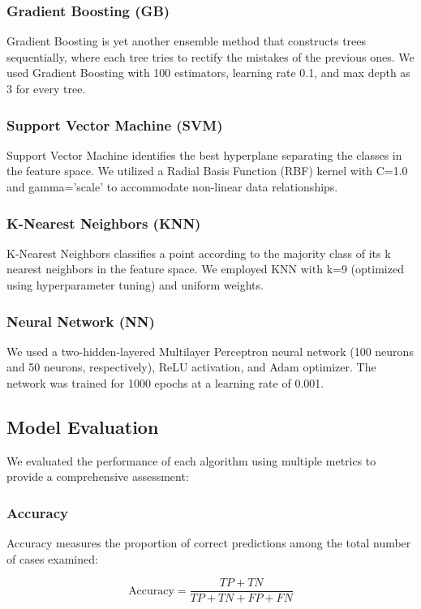 \documentclass[conference]{IEEEtran}
\begin{document}
\begin{itemize}
\subsubsection{Gradient Boosting (GB)}
Gradient Boosting is yet another ensemble method that constructs trees sequentially, where each tree tries to rectify the mistakes of the previous ones. We used Gradient Boosting with 100 estimators, learning rate 0.1, and max depth as 3 for every tree.

\subsubsection{Support Vector Machine (SVM)}
Support Vector Machine identifies the best hyperplane separating the classes in the feature space. We utilized a Radial Basis Function (RBF) kernel with C=1.0 and gamma='scale' to accommodate non-linear data relationships.

\subsubsection{K-Nearest Neighbors (KNN)}
K-Nearest Neighbors classifies a point according to the majority class of its k nearest neighbors in the feature space. We employed KNN with k=9 (optimized using hyperparameter tuning) and uniform weights.

\subsubsection{Neural Network (NN)}
We used a two-hidden-layered Multilayer Perceptron neural network (100 neurons and 50 neurons, respectively), ReLU activation, and Adam optimizer. The network was trained for 1000 epochs at a learning rate of 0.001.

\subsection{Model Evaluation}
We evaluated the performance of each algorithm using multiple metrics to provide a comprehensive assessment:

\subsubsection{Accuracy}
Accuracy measures the proportion of correct predictions among the total number of cases examined:

\begin{equation}
\text{Accuracy} = \frac{TP + TN}{TP + TN + FP + FN}
\end{equation}


\end{itemize}
\end{document}
